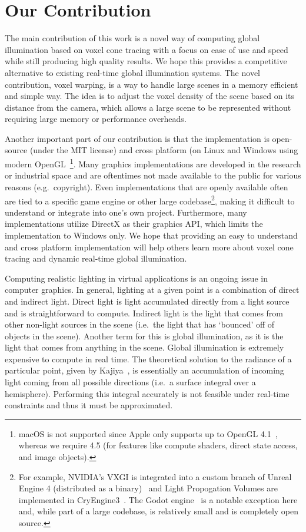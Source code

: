 \section{Our Contribution}
The main contribution of this work is a novel way of computing global illumination based on voxel cone tracing with a focus on ease of use and speed while still producing high quality results. We hope this provides a competitive alternative to existing real-time global illumination systems. The novel contribution, voxel warping, is a way to handle large scenes in a memory efficient and simple way. The idea is to adjust the voxel density of the scene based on its distance from the camera, which allows a large scene to be represented without requiring large memory or performance overheads.

Another important part of our contribution is that the implementation is open-source (under the MIT license) and cross platform (on Linux and Windows using modern OpenGL~\footnote{macOS is not supported since Apple only supports up to OpenGL 4.1~\cite{appleopenglsupport}, whereas we require 4.5 (for features like compute shaders, direct state access, and image objects).}. Many graphics implementations are developed in the research or industrial space and are oftentimes not made available to the public for various reasons (e.g.\ copyright). Even implementations that are openly available often are tied to a specific game engine or other large codebase\footnote{For example, NVIDIA's VXGI is integrated into a custom branch of Unreal Engine 4 (distributed as a binary)~\cite{nvidiavxgi} and Light Propogation Volumes are implemented in CryEngine3~\cite{kaplanyan2009light}. The Godot engine~\cite{godotengine} is a notable exception here and, while part of a large codebase, is relatively small and is completely open source.}, making it difficult to understand or integrate into one's own project. Furthermore, many implementations utilize DirectX as their graphics API, which limits the implementation to Windows only. We hope that providing an easy to understand and cross platform implementation will help others learn more about voxel cone tracing and dynamic real-time global illumination.

\iffalse
Computing realistic lighting in virtual applications is an ongoing issue in computer graphics. In general, lighting at a given point is a combination of direct and indirect light. Direct light is light accumulated directly from a light source and is straightforward to compute. Indirect light is the light that comes from other non-light sources in the scene (i.e.\ the light that has `bounced' off of objects in the scene). Another term for this is global illumination, as it is the light that comes from anything in the scene. Global illumination is extremely expensive to compute in real time. The theoretical solution to the radiance of a particular point, given by Kajiya~\cite{kajiya1986rendering}, is essentially an accumulation of incoming light coming from all possible directions (i.e.\ a surface integral over a hemisphere). Performing this integral accurately is not feasible under real-time constraints and thus it must be approximated.

